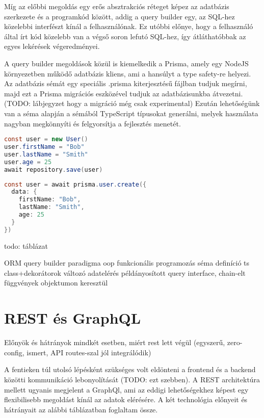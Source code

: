 Míg az előbbi megoldás egy erős absztrakciós réteget képez az adatbázis szerkezete és a programkód között, addig a query builder egy, az SQL-hez közelebbi interfészt kínál a felhasználónak.
Ez utóbbi előnye, hogy a felhasználó által írt kód közelebb van a végső soron lefutó SQL-hez, így átláthatóbbak az egyes lekérések végeredményei.

A query builder megoldások közül is kiemelkedik a Prisma, amely egy NodeJS környezetben működő adatbázis kliens, ami a hansúlyt a type safety-re helyezi.
Az adatbázis sémát egy speciális .prisma kiterjesztésű fájlban tudjuk megírni, majd ezt a Prisma migrációs eszközével tudjuk az adatbázisunkba átvezetni. (TODO: lábjegyzet hogy a migráció még csak experimental)
Ezután lehetőségünk van a séma alapján a sémából TypeScript típusokat generálni, melyek használata nagyban megkönnyíti és felgyorsítja a fejlesztés menetét.

\begin{lstlisting}[language=Java, caption=Adatbázis beillesztés TypeORM környezetben]
const user = new User()
user.firstName = "Bob"
user.lastName = "Smith"
user.age = 25
await repository.save(user)
\end{lstlisting}

\begin{lstlisting}[language=Java, caption=Adatbázis beillesztés Prisma segítségével]
const user = await prisma.user.create({
  data: {
    firstName: "Bob",
    lastName: "Smith",
    age: 25
  }
})
\end{lstlisting}

todo: táblázat

                  ORM                     query builder
paradigma         oop                  funkcionális programozás
séma definíció  ts class+dekorátorok         változó
adatelérés     példányosított            query interface, chain-elt függvények
              objektumon keresztül




\section{REST és GraphQL}
Előnyök és hátrányok mindkét esetben, miért rest lett végül (egyszerű, zero-config, ismert, API routes-szal jól integrálódik)

A fentieken túl utolsó lépésként szükséges volt eldönteni a frontend és a backend közötti kommunikáció lebonyolítását (TODO: ezt szebben).
A REST architektúra mellett ugyanis megjelent a GraphQl, ami az eddigi lehetőségekhez képest egy flexibilisebb megoldást kínál az adatok elérésére.
A két technológia előnyeit és hátrányait az alábbi táblázatban foglaltam össze.

